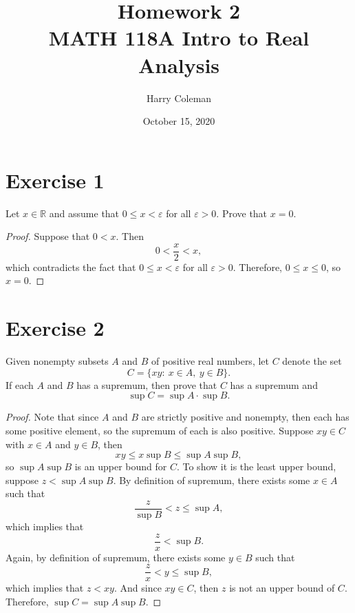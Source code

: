 \documentclass[12pt]{article}
\newenvironment{problem}
    {\begin{lrbox}{\mybox}\begin{minipage}{\textwidth-10pt}}
    {\end{minipage}\end{lrbox}\framebox[6.5in]{\usebox{\mybox}}}
\let\eps\varepsilon
\begin{document}
 
\title{Homework 2\\
    \large MATH 118A Intro to Real Analysis
}
\author{Harry Coleman}
\date{October 15, 2020}
\maketitle

\section*{Exercise 1}
\begin{problem}
    Let $x \in \mathbb{R}$ and assume that $0 \le x <  \eps$ for all $\eps >0$. Prove that $x=0$.
\end{problem}

\begin{proof}
    Suppose that $0<x$. Then
    \[0<\frac x2 < x,\]
    which contradicts the fact that $0\leq x < \eps$ for all $\eps>0$. Therefore, $0\leq x\leq 0$, so $x=0$.
    
\end{proof}

\section*{Exercise 2}
\begin{problem}
    Given nonempty subsets $A$ and $B$ of positive real numbers, let $C$ denote the set
    \[
     C = \{ xy:\ x \in A,\ y\in B\}.
    \]
    If each $A$ and $B$ has a supremum, then prove that $C$ has a supremum and 
    \[
     \sup C = \sup A \cdot  \sup B.
    \]
\end{problem}

\begin{proof}
    Note that since $A$ and $B$ are strictly positive and nonempty, then each has some positive element, so the supremum of each is also positive. Suppose $xy\in C$ with $x\in A$ and $y\in B$, then
    \[xy \leq x\sup B \leq \sup A \sup B,\]
    so $\sup A\sup B$ is an upper bound for $C$. To show it is the least upper bound, suppose $z<\sup A\sup B$. By definition of supremum, there exists some $x\in A$ such that
    \[\frac z{\sup B} < z \leq \sup A,\]
    which implies that
    \[\frac zx < \sup B.\]
    Again, by definition of supremum, there exists some $y\in B$ such that
    \[\frac zx < y \leq \sup B,\]
    which implies that $z<xy$. And since $xy\in C$, then $z$ is not an upper bound of $C$. Therefore, $\sup C = \sup A \sup B$.
    
\end{proof}
\end{document}

